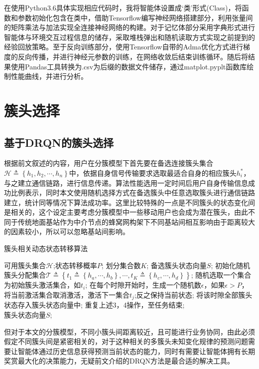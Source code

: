在使用Python3.6具体实现相应代码时，我将智能体设置成‘类’形式(Class)，将函数和参数初始化包含在类中，借助Tensorflow编写神经网络搭建部分，利用张量间的矩阵乘法与加法实现全连接神经网络的构建。对于记忆体部分采用字典形式进行智能体与环境交互过程信息的储存，采取堆栈弹出和随机读取方式实现之前提到的经验回放策略。至于反向训练部分，使用Tensorflow自带的Adma优化方式进行梯度的反向传播，并进行神经元参数的训练，在网络收敛后结束训练循环。随后将结果使用Pandas工具转换为.csv为后缀的数据文件储存，通过matplot.pyplt函数库绘制性能曲线，并进行分析。

\section{簇头选择}
\subsection{基于DRQN的簇头选择}
根据前文叙述的内容，用户在分簇模型下首先要在备选连接簇头集合$\mathcal{H} \triangleq \left \{ h_{1} ,h_{2},\cdots,h_{n}\right \}$中，依据自身信号传输要求选取最适合自身的相应簇头$h_{i}^{*}$，与之建立通信链路，进行信息传递。算法性能选用一定时间后用户自身传输信息成功比例表示，同时本文使用随机选择方式在备选簇头中任意选取簇头进行通信链路建立，统计同等情况下算法成功率。这里比较特殊的一点是不同簇头的状态变化间是相关的，这个设定主要考虑分簇模型中一些移动用户也会成为潜在簇头，由此不同于传统地面基站作为中介节点的蜂窝网构架下不同基站间相互影响由于距离较大的因素较小，所以可以忽略基站间影响。

\begin{algorithm}[htb]  
	\caption{簇头相关动态状态转移算法}  
	\label{alg:headstate}  
	\begin{algorithmic}[1]  
		\Require  
		可用簇头集合$\mathcal{H}$;状态转移概率$P$; 划分集合数$K$; 
		\Ensure  
		备选簇头状态向量$S$;  
		\State 初始化随机簇头分配集合$\mathcal{T}\triangleq\left \{ t_{1}\triangleq\left \{h_{a},\cdots,h_{b}\right \} ,\cdots,t_{K}\triangleq\left \{h_{c},\cdots,h_{d}\right \}\right \}$;
		\State 随机选取一个集合为初始簇头激活集合，如$t_{i}$;				
		\State 在每个时隙开始时，生成一个随机数$\epsilon$，如果$\epsilon>P$，将当前激活集合取消激活，激活下一集合$t_{j}$;反之保持当前状态;  
		\State 将该时隙全部簇头状态存入簇头状态向量中;
		\State 重复上述3，4操作，至任务结束; \\
		\Return 簇头状态向量$S$;  
	\end{algorithmic}  
\end{algorithm}  

但对于本文的分簇模型，不同小簇头间距离较近，且可能进行业务协同，由此必须假定不同簇头间是紧密相关的，对于这种相关的多簇头未知变化规律的预测问题需要让智能体通过历史信息获得预测当前状态的能力，同时有需要让智能体拥有长期奖赏最大化的决策能力，无疑前文介绍的DRQN方法是最合适的解决工具。

